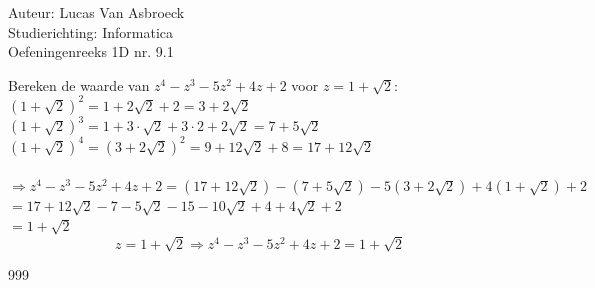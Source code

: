 \documentclass[a4paper]{article}
\begin{document}
\noindent \large Auteur: Lucas Van Asbroeck \\
\noindent \large Studierichting: Informatica\\
\noindent \large Oefeningenreeks 1D nr. 9.1\\

\medskip

\normalsize

Bereken de waarde van $z^4 - z^3 - 5z^2 + 4z + 2$ voor $z = 1 + \sqrt{2}$:\\


$(1 + \sqrt{2})^2 = 1 + 2\sqrt{2} + 2 = 3 + 2\sqrt{2}$\\

$(1 + \sqrt{2})^3 = 1 + 3 \cdot \sqrt{2} + 3 \cdot 2 + 2\sqrt{2} = 7 + 5\sqrt{2}$\\

$(1 + \sqrt{2})^4 = (3+2\sqrt{2})^2 = 9 + 12\sqrt{2} + 8 = 17 + 12\sqrt{2}$\\\\

$\Rightarrow z^4 - z^3 - 5z^2 + 4z + 2 =  (17 + 12\sqrt{2}) - (7 + 5\sqrt{2}) -5(3 + 2\sqrt{2}) + 4(1 + \sqrt{2}) + 2$\\

$= 17 + 12\sqrt{2} - 7 - 5\sqrt{2} - 15 - 10\sqrt{2} + 4 + 4\sqrt{2}  + 2$\\

$= 1 + \sqrt{2}$\\

$$\boxed{z = 1 + \sqrt{2} \Rightarrow z^4 - z^3 - 5z^2 + 4z + 2 = 1 + \sqrt{2}}$$
	
\begin{thebibliography}{999}
\end{thebibliography}
\end{document}
